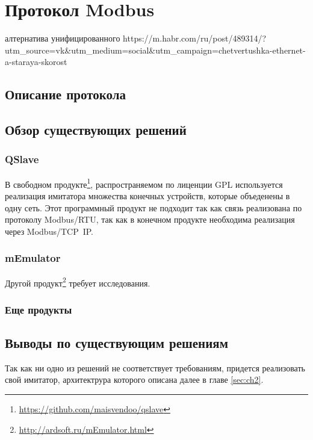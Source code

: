 
\chapter{Протокол Modbus}\label{ch:ch2}

алтернатива унифицированного 
https://m.habr.com/ru/post/489314/?utm_source=vk&utm_medium=social&utm_campaign=chetvertushka-ethernet-a-staraya-skorost

\section{Описание протокола}

\section{Обзор существующих решений}\label{sec:ch2/sec1}
\subsection{QSlave}

В свободном продукте\footnote{\url{https://github.com/maisvendoo/qslave}}, распространяемом по лиценции GPL используется
реализация имитатора множества конечных устройств, которые объеденены в одну сеть.
Этот программный продукт не подходит так как связь реализована по протоколу
Modbus/RTU, так как в конечном продукте необходима реализация через Modbus/TCP~IP.

\subsection{mEmulator}
Другой продукт\footnote{\url{http://ardsoft.ru/mEmulator.html}} требует исследования.


\subsection{Еще продукты}


\section{Выводы по существующим решениям}

Так как ни одно из решений не соответствует требованиям, придется реализовать свой
имитатор, архитектрура которого описана далее в главе \ref{sec:ch2}.
